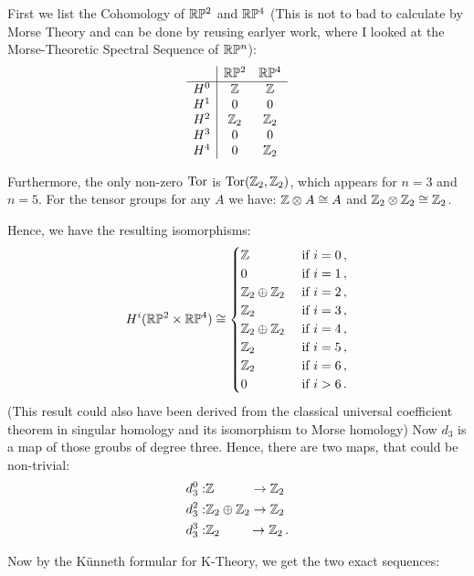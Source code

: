 \begin{example}[$\R\PP^2\times \R\PP^4$]
    First we list the Cohomology of $\mathbb{R}\mathbb{P}^2$ and $\mathbb{R}\mathbb{P}^4$ (This is not to bad to calculate by Morse Theory and can be done by reusing earlyer work, where I looked at the Morse-Theoretic Spectral Sequence of $\mathbb{R}\mathbb{P}^n$):
	\begin{equation*}
		\begin{array}{c|c c}
			& \mathbb{R}\mathbb{P}^2 &\mathbb{R}\mathbb{P}^4\\
			\hline
			H^0&\mathbb{Z}&\mathbb{Z} \\
			H^1&0&0\\
			H^2&\mathbb{Z}_2&\mathbb{Z}_2\\
			H^3&0&0\\
			H^4&0&\mathbb{Z}_2
		\end{array}
	\end{equation*}

    Furthermore, the only non-zero $\operatorname{\mathrm{Tor}}$ is $\operatorname{\mathrm{Tor}}(\mathbb{Z}_2,\mathbb{Z}_2)$, which appears for $n=3$ and $n=5$. For the tensor groups for any $A$ we have: $\mathbb{Z}\otimes A\cong A$ and $\mathbb{Z}_2\otimes \mathbb{Z}_2 \cong \mathbb{Z}_2$. 

    Hence, we have the resulting isomorphisms: 
 \begin{equation*}
 	H^i(\mathbb{R}\mathbb{P}^2\times \mathbb{R}\mathbb{P}^4)\cong \begin{cases}
 		\mathbb{Z} & \text{ if }i=  0\,,\\
	 	0  & \text{ if }i=  1\,,\\
	 	\mathbb{Z}_2\oplus \mathbb{Z}_2& \text{ if }i= 2\,,\\
	 	\mathbb{Z}_2 & \text{ if }i=  3\,,\\
	 	\mathbb{Z}_2\oplus \mathbb{Z}_2 & \text{ if }i=  4\,,\\
	 	\mathbb{Z}_2& \text{ if }i=  5\,,\\
	 	\mathbb{Z}_2& \text{ if }i=  6\,,\\
	 	0& \text{ if }i>6\,.
 	\end{cases}
 \end{equation*}
(This result could also have been derived from the classical universal coefficient theorem in singular homology and its isomorphism to Morse homology)
 Now $d_3$ is a map of those groubs of degree three. Hence, there are two maps, that could be non-trivial:
\begin{align}
    d_3^0: &\Z\phantom{_2\oplus \Z_2}\to \Z_2\\
    d_3^2: &\Z_2\oplus \Z_2 \to \Z_2\\
    d_3^3: &\Z_2\phantom{~\oplus \Z_2}\to \Z_2\,.
\end{align}

Now by the Künneth formular for K-Theory, we get the two exact sequences:
\begin{center}


\end{center}
\end{example}
